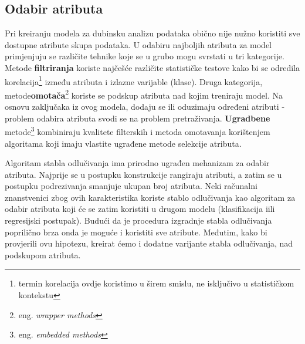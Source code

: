 \subsection{Odabir atributa}
Pri kreiranju modela za dubinsku analizu podataka obično nije nužno koristiti sve dostupne atribute skupa podataka. U odabiru najboljih atributa za model primjenjuju se različite tehnike koje se u grubo mogu svrstati u tri kategorije. Metode \textbf{filtriranja} koriste najčešće različite statističke testove kako bi se odredila korelacija\footnote{termin korelacija ovdje koristimo u širem smislu, ne isključivo u statističkom kontekstu} između atributa i izlazne varijable (klase). Druga kategorija, metode\textbf{omotača}\footnote{eng. \textit{wrapper methods}} koriste se podskup atributa nad kojim treniraju model. Na osnovu zaključaka iz ovog modela, dodaju se ili oduzimaju određeni atributi - problem odabira atributa svodi se na problem pretraživanja. \textbf{Ugradbene} metode\footnote{eng. \textit{embedded methods}} kombiniraju kvalitete filterskih i metoda omotavanja korištenjem algoritama koji imaju vlastite ugrađene metode selekcije atributa.

Algoritam stabla odlučivanja ima prirodno ugrađen mehanizam za odabir atributa. Najprije se u postupku konstrukcije rangiraju atributi, a zatim se u postupku podrezivanja smanjuje ukupan broj atributa. Neki računalni znanstvenici\cite{Grabczewski01} zbog ovih karakteristika koriste stablo odlučivanja kao algoritam za odabir atributa koji će se zatim koristiti u drugom modelu (klasifikacija iili regresijski postupak). Budući da je procedura izgradnje stabla odlučivanja poprilično brza onda je moguće i koristiti sve atribute. Međutim, kako bi provjerili ovu hipotezu, kreirat ćemo i dodatne varijante stabla odlučivanja, nad podskupom atributa.

